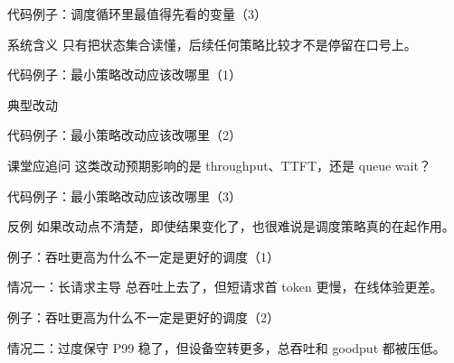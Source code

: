 \begin{frame}{代码例子：调度循环里最值得先看的变量（3）}
\begin{block}{系统含义}
    只有把状态集合读懂，后续任何策略比较才不是停留在口号上。
  \end{block}
\end{frame}

\begin{frame}{代码例子：最小策略改动应该改哪里（1）}
\begin{block}{典型改动}
    {\ttfamily\small
    \par
    \par
    }
  \end{block}
\end{frame}

\begin{frame}{代码例子：最小策略改动应该改哪里（2）}
\begin{block}{课堂应追问}
    这类改动预期影响的是 throughput、TTFT，还是 queue wait？
  \end{block}
\end{frame}

\begin{frame}{代码例子：最小策略改动应该改哪里（3）}
\begin{block}{反例}
    如果改动点不清楚，即使结果变化了，也很难说是调度策略真的在起作用。
  \end{block}
\end{frame}

\begin{frame}{例子：吞吐更高为什么不一定是更好的调度（1）}
\begin{block}{情况一：长请求主导}
    总吞吐上去了，但短请求首 token 更慢，在线体验更差。
  \end{block}
\end{frame}

\begin{frame}{例子：吞吐更高为什么不一定是更好的调度（2）}
\begin{block}{情况二：过度保守}
    P99 稳了，但设备空转更多，总吞吐和 goodput 都被压低。
  \end{block}
\end{frame}

